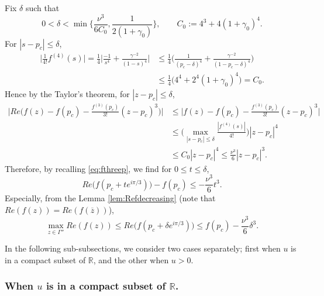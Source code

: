 \documentclass[11pt]{article}
\begin{document}
Fix $\delta$ such that
\begin{equation}\label{eq:delta}
  0< \delta < \min\bigl\{ \frac{\nu^3}{6C_0},
  \frac{1}{2(1+\gamma_0)} \bigr\},
  \qquad C_0:= 4^3+4(1+\gamma_0)^4.
\end{equation}
For $|s-p_c|\le \delta$,
\begin{equation}
\begin{split}
  \biggl|\frac1{4!}f^{(4)}(s) \biggr| = \frac14 \biggl|
  \frac{-1}{s^4}+\frac{\gamma^{-2}}{(1-s)^4} \biggr|
  &\le \frac14 \biggl(
  \frac1{(p_c-\delta)^4}+\frac{\gamma^{-2}}{(1-p_c-\delta)^4}
  \biggr) \\
  &\le \frac1{4}\bigl( 4^4+2^4(1+\gamma_0)^4 \bigr)=C_0.
\end{split}
\end{equation}
Hence by the Taylor's theorem, for $|z-p_c|\le \delta$,
\begin{equation}\label{eq:fineqmain}
\begin{split}
   \biggl|Re\bigl( f(z)-f(p_c) - \frac{f^{(3)}(p_c)}{3!}(z-p_c)^3 \bigr) \biggr|
  &\le \bigl| f(z)-f(p_c) - \frac{f^{(3)}(p_c)}{3!}(z-p_c)^3 \bigr|
  \\
  &   \le \biggl( \max_{|s-p_c|\le \delta}
\frac{|f^{(4)}(s)|}{4!} \biggr)
  |z-p_c|^4  \\
  &  \le C_0 |z-p_c|^4
  \le \frac{\nu^3}6 |z-p_c|^3.
\end{split}
\end{equation}
Therefore, by recalling \eqref{eq:fthreep}, we find for $0\le t\le
\delta$,
\begin{equation}
  Re\bigl( f(p_c+ t e^{i\pi/3}) \bigr) -f(p_c)
  \le - \frac{\nu^3}{6} t^3.
\end{equation}
Especially, from the Lemma \ref{lem:Refdecreasing} (note
that $Re(f(z))= Re(f(\overline{z}))$),
\begin{equation}\label{eq:finqcubic}
  \max_{z\in\Gamma''} Re(f(z)) \le Re\bigl(f(p_c+\delta e^{i\pi/3})\bigr)
  \le f(p_c) - \frac{\nu^3}{6}\delta^3.
\end{equation}

In the following sub-subsections, we consider two cases
separately; first when $u$ is in a compact subset of $\mathbb{R}$,
and the other when $u>0$.


\subsubsection{When $u$ is in a compact subset of $\mathbb{R}$.}
\end{document}

